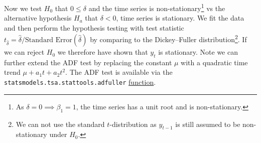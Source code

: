 Now we test $H_{0}$ that $0 \leq \delta$ and the time series is
non-stationary\footnote{As $\delta = 0 \implies \beta_{1} = 1$, \ie the time series has a unit root and is non-stationary.}
vs the alternative hypothesis $H_{a}$ that $\delta < 0$, \ie time series is stationary.
We fit the data and then perform the hypothesis testing with test statistic
$t_{\hat{\delta}} = \hat{\delta} / \text{Standard Error}\left(\hat{\delta}\right)$
by comparing to the Dickey--Fuller distribution\footnote{We can not use the standard $t$-distribution as $y_{t-1}$ is still assumed to be non-stationary under $H_{0}$.}.
If we can reject $H_{0}$ we therefore have shown that $y_{t}$ is stationary.
Note we can further extend the ADF test by replacing the constant $\mu$
with a quadratic time trend $\mu + a_{1} t + a_{2} t^{2}$.
The ADF test is available via the \texttt{statsmodels.tsa.stattools.adfuller}
\href{https://www.statsmodels.org/dev/generated/statsmodels.tsa.stattools.adfuller.html}{function}.
